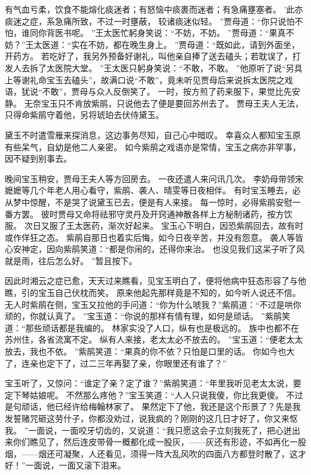 有气血亏柔，饮食不能熔化痰迷者；有怒恼中痰裹而迷者；有急痛壅塞者。
’此亦痰迷之症，系急痛所致，不过一时壅蔽，
较诸痰迷似轻。
”贾母道：“你只说怕不怕，谁同你背医书呢。
”王太医忙躬身笑说：“不妨，不妨。
”贾母道：“果真不妨？”王太医道：“实在不妨，都在晚生身上。
”贾母道：“既如此，请到外面坐，开药方。
若吃好了，我另外预备好谢礼，叫他亲自捧了送去磕头；若耽误了，打发人去拆了太医院大堂。
”王太医只躬身笑说：“不敢，不敢。
”他原听了说“另具上等谢礼命宝玉去磕头”，故满口说“不敢”，竟未听见贾母后来说拆太医院之戏语，犹说“不敢”，贾母与众人反倒笑了。
一时，按方煎了药来服下，果觉比先安静。
无奈宝玉只不肯放紫鹃，只说他去了便是要回苏州去了。
贾母王夫人无法，只得命紫鹃守着他，另将琥珀去伏侍黛玉。
\par
黛玉不时遣雪雁来探消息，这边事务尽知，自己心中暗叹。
幸喜众人都知宝玉原有些呆气，自幼是他二人亲密。
如今紫鹃之戏语亦是常情，宝玉之病亦非罕事，因不疑到别事去。
\par
晚间宝玉稍安，贾母王夫人等方回房去。
一夜还遣人来问讯几次。
李奶母带领宋嬷嬷等几个年老人用心看守，紫鹃、袭人、晴雯等日夜相伴。
有时宝玉睡去，必从梦中惊醒，不是哭了说黛玉已去，便是有人来接。
每一惊时，必得紫鹃安慰一番方罢。
彼时贾母又命将祛邪守灵丹及开窍通神散各样上方秘制诸药，按方饮服。
次日又服了王太医药，渐次好起来。
宝玉心下明白，因恐紫鹃回去，故有时或作佯狂之态。
紫鹃自那日也着实后悔，如今日夜辛苦，并没有怨意。
袭人等皆心安神定，因向紫鹃笑道：“都是你闹的，还得你来治。
也没见我们这呆子听了风就是雨，往后怎么好。
”暂且按下。
\par
因此时湘云之症已愈，天天过来瞧看，见宝玉明白了，便将他病中狂态形容了与他瞧，引的宝玉自己伏枕而笑。
原来他起先那样竟是不知的，如今听人说还不信。
无人时紫鹃在侧，宝玉又拉他的手问道：“你为什么唬我？”紫鹃道：“不过是哄你顽的，你就认真了。
”宝玉道：“你说的那样有情有理，如何是顽话。
”紫鹃笑道：“那些顽话都是我编的。
林家实没了人口，纵有也是极远的。
族中也都不在苏州住，各省流寓不定。
纵有人来接，老太太必不放去的。
”宝玉道：“便老太太放去，我也不依。
”紫鹃笑道：“果真的你不依？只怕是口里的话。
你如今也大了，连亲也定下了，过二三年再娶了亲，你眼里还有谁了？”\par
宝玉听了，又惊问：“谁定了亲？定了谁？”紫鹃笑道：“年里我听见老太太说，要定下琴姑娘呢。
不然那么疼他？”宝玉笑道：“人人只说我傻，你比我更傻。
不过是句顽话，他已经许给梅翰林家了。
果然定下了他，我还是这个形景了？先是我发誓赌咒砸这劳什子，你都没劝过，说我疯的？刚刚的这几日才好了，你又来怄我。
”一面说，一面咬牙切齿的，又说道：“我只愿这会子立刻我死了，把心迸出来你们瞧见了，然后连皮带骨一概都化成一股灰，——灰还有形迹，不如再化一股烟，——烟还可凝聚，人还看见，须得一阵大乱风吹的四面八方都登时散了，这才好！”一面说，一面又滚下泪来。
